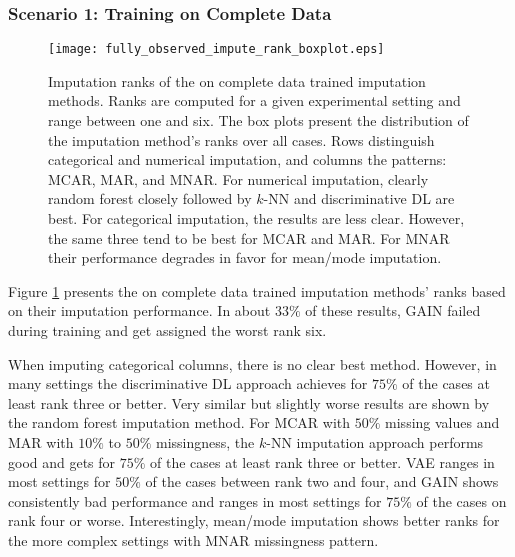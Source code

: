 \subsubsection{Scenario 1: Training on Complete Data}
\label{sec:results_experiment1_scenario1}

\begin{figure}\centering
    \texttt{[image: fully\_observed\_impute\_rank\_boxplot.eps]}
    \caption[Imputation Ranks - Fully Observed]{Imputation ranks of the on complete data trained imputation methods. Ranks are computed for a given experimental setting and range between one and six. The box plots present the distribution of the imputation method's ranks over all cases. Rows distinguish categorical and numerical imputation, and columns the patterns: MCAR, MAR, and MNAR. For numerical imputation, clearly random forest closely followed by $k$-NN and discriminative DL are best. For categorical imputation, the results are less clear. However, the same three tend to be best for MCAR and MAR. For MNAR their performance degrades in favor for mean/mode imputation.
	}
	\label{fig:fully_observed_impute_rank_boxplot}
\end{figure}


Figure \ref{fig:fully_observed_impute_rank_boxplot} presents the on complete data trained imputation methods' ranks based on their imputation performance. In about $33\%$ of these results, GAIN failed during training and get assigned the worst rank six.

When imputing categorical columns, there is no clear best method. However, in many settings the discriminative DL approach achieves for $75\%$ of the cases at least rank three or better. Very similar but slightly worse results are shown by the random forest imputation method. For MCAR with $50\%$ missing values and MAR with $10\%$ to $50\%$ missingness, the $k$-NN imputation approach performs good and gets for $75\%$ of the cases at least rank three or better. VAE ranges in most settings for $50\%$ of the cases between rank two and four, and GAIN shows consistently bad performance and ranges in most settings for $75\%$ of the cases on rank four or worse. Interestingly, mean/mode imputation shows better ranks for the more complex settings with MNAR missingness pattern.

